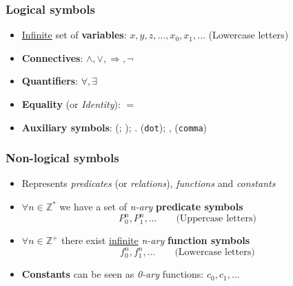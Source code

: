 \documentclass{beamer}
\begin{document}
                \begin{frame}
                    \frametitle{Logical symbols}
                    \begin{itemize}
                        \item \underline{Infinite} set of \textbf{variables}: $ x, y, z, \dots, x_0, x_1, \dots $ (Lowercase letters)
                        \item \textbf{Connectives}: $ \wedge, \vee, \Rightarrow, \neg $
                        \item \textbf{Quantifiers}: $ \forall, \exists $
                        \item \textbf{Equality} (or \textit{Identity}): $ = $
                        \item \textbf{Auxiliary symbols}: (; ); . (\texttt{dot}); , (\texttt{comma})
                    \end{itemize}
                \end{frame}

                \begin{frame}
                    \frametitle{Non-logical symbols}
                    \begin{itemize}
                        \item Represents \textit{predicates} (or \textit{relations}), \textit{functions} and \textit{constants}
                        \item $ \forall n \in \mathbb{Z^*} $ we have a set of \textit{n-ary} \textbf{predicate symbols}
                        \[
                            P^n_0, P^n_1, \dots \quad\quad \text{(Uppercase letters)}
                        \] 
                        \item $ \forall n \in \mathbb{Z^+} $ there exist \underline{infinite} \textit{n-ary} \textbf{function symbols}
                        \[
                            f^n_0, f^n_1, \dots \quad\quad \text{(Lowercase letters)}
                        \]
                        \item \textbf{Constants} can be seen as \textit{0-ary} functions: $ c_0, c_1, \dots $
                    \end{itemize}
                \end{frame}
\end{document}
